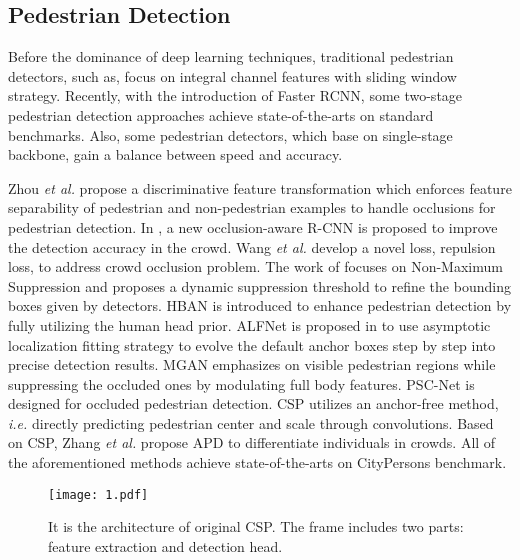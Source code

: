 \documentclass[twocolumn]{article}
\begin{document}
\subsection{Pedestrian Detection}
Before the dominance of deep learning techniques, traditional pedestrian detectors, such as\cite{dollar2014fast, nam2014local, zhang2015filtered}, focus on integral channel features with sliding window strategy. Recently, with the introduction of Faster RCNN\cite{ren2015faster}, some two-stage pedestrian detection approaches\cite{zhang2017citypersons, pang2019mask, zhou2018bi, zhou2019discriminative, zhang2018occluded, liu2019adaptive, zhang2018occlusion, wang2018repulsion} achieve state-of-the-arts on standard benchmarks. Also, some pedestrian detectors\cite{li2018csrnet, liu2018learning, liu2019adaptive}, which base on single-stage backbone, gain a balance between speed and accuracy. \par 
Zhou \textit{et al.}\cite{zhou2019discriminative} propose a discriminative feature transformation which enforces feature separability of pedestrian and non-pedestrian examples to handle occlusions for pedestrian detection. In \cite{zhang2018occlusion}, a new occlusion-aware R-CNN is proposed to improve the detection accuracy in the crowd. Wang  \textit{et al.}\cite{wang2018repulsion} develop a novel loss, repulsion loss, to address crowd occlusion problem. The work of \cite{liu2019adaptive} focuses on Non-Maximum Suppression and proposes a dynamic suppression threshold to refine the bounding boxes given by detectors. HBAN\cite{lu2019semantic} is introduced to enhance pedestrian detection by fully utilizing the human head prior. ALFNet is proposed in \cite{liu2018learning} to use asymptotic localization fitting strategy to evolve the default anchor boxes step by step into precise detection results. MGAN\cite{pang2019mask} emphasizes on visible pedestrian regions while suppressing the occluded ones by modulating full body features. PSC-Net\cite{xie2020psc} is designed for occluded pedestrian detection. CSP\cite{liu2019high} utilizes an anchor-free method, \textit{i.e.} directly predicting pedestrian center and scale through convolutions. Based on CSP\cite{liu2019high}, Zhang \textit{et al.} propose APD\cite{DBLP:journals/corr/abs-1910-09188} to differentiate individuals in crowds. All of the aforementioned methods achieve state-of-the-arts on CityPersons benchmark\cite{zhang2017citypersons}.
\begin{figure*}[h]
\centering
\texttt{[image: 1.pdf]}
\caption{It is the architecture of original CSP\cite{liu2019high}. The frame includes two parts: feature extraction and detection head.}
\label{fig:1}
\end{figure*}
\end{document}
